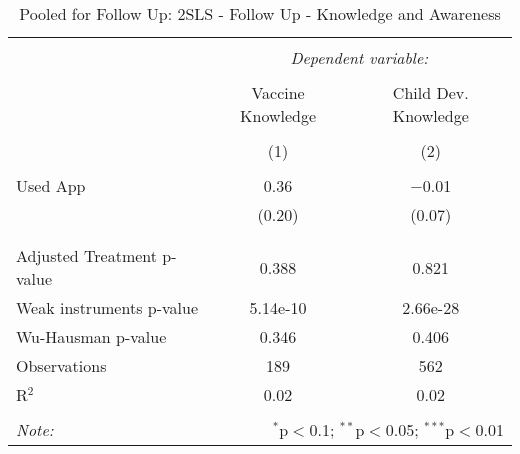 
\begin{table}[!htbp] \centering 
  \caption{Pooled for Follow Up: 2SLS - Follow Up - Knowledge and Awareness} 
  \label{tbl:Pooled for Follow Up: 2SLS - Follow Up - Knowledge and Awareness} 
\begin{tabular}{@{\extracolsep{5pt}}lcc} 
\\[-1.8ex]\hline 
\hline \\[-1.8ex] 
 & \multicolumn{2}{c}{\textit{Dependent variable:}} \\ 
\cline{2-3} 
\\[-1.8ex] & Vaccine Knowledge & Child Dev. Knowledge \\ 
\\[-1.8ex] & (1) & (2)\\ 
\hline \\[-1.8ex] 
 Used App & 0.36 & $-$0.01 \\ 
  & (0.20) & (0.07) \\ 
  & & \\ 
\hline \\[-1.8ex] 
Adjusted Treatment p-value & 0.388 & 0.821 \\ 
Weak instruments p-value & 5.14e-10 & 2.66e-28 \\ 
Wu-Hausman p-value & 0.346 & 0.406 \\ 
Observations & 189 & 562 \\ 
R$^{2}$ & 0.02 & 0.02 \\ 
\hline 
\hline \\[-1.8ex] 
\textit{Note:}  & \multicolumn{2}{r}{$^{*}$p$<$0.1; $^{**}$p$<$0.05; $^{***}$p$<$0.01} \\ 
\end{tabular} 
\end{table} 
